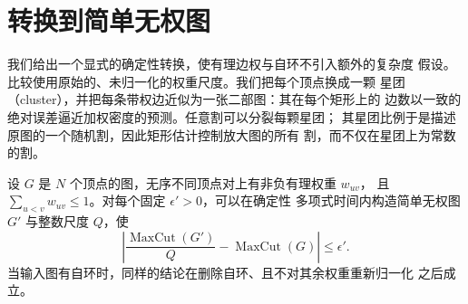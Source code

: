 \section{转换到简单无权图}\label{sec:unweighted}

我们给出一个显式的确定性转换，使有理边权与自环不引入额外的复杂度
假设。比较使用原始的、未归一化的权重尺度。我们把每个顶点换成一颗
星团（cluster），并把每条带权边近似为一张二部图：其在每个矩形上的
边数以一致的绝对误差逼近加权密度的预测。任意割可以分裂每颗星团；
其星团比例于是描述原图的一个随机割，因此矩形估计控制放大图的所有
割，而不仅在星团上为常数的割。

\begin{lemma}\label{lem:unweighted}
设 $G$ 是 $N$ 个顶点的图，无序不同顶点对上有非负有理权重 $w_{uv}$，
且 $\sum_{u<v}w_{uv}\le1$。对每个固定 $\epsilon'>0$，可以在确定性
多项式时间内构造简单无权图 $G'$ 与整数尺度 $Q$，使
\[
 \left|\frac{\operatorname{MaxCut}(G')}{Q}
             -\operatorname{MaxCut}(G)\right|\le\epsilon'.
\]
当输入图有自环时，同样的结论在删除自环、且不对其余权重重新归一化
之后成立。
\end{lemma}

